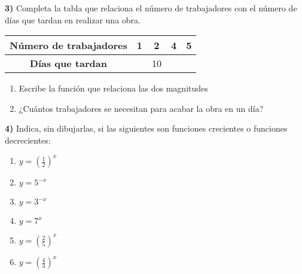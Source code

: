 \documentclass[12pt,a4paper]{article}
\begin{document}
\textbf{3)} Completa la tabla que relaciona el número de trabajadores con el número de días que tardan en realizar una obra.

\begin{center}
\begin{tabular}{|c|c|c|c|c|}
\hline
\textbf{Número de trabajadores} & 1 & 2 & 4 & 5 \\
\hline
\textbf{Días que tardan} & & 10 & & \\
\hline
\end{tabular}
\end{center}

\begin{enumerate}[label=\alph*.]
\item Escribe la función que relaciona las dos magnitudes
\item ¿Cuántos trabajadores se necesitan para acabar la obra en un día?
\end{enumerate}

\textbf{4)} Indica, sin dibujarlas, si las siguientes son funciones crecientes o funciones decrecientes:

\begin{enumerate}[label=\alph*.]
	
	\vspace{5mm}
	
\item $y = \left(\frac{1}{2}\right)^x$

\vspace{5mm}

\item $y = 5^{-x}$

\vspace{5mm}

\item $y = 3^{-x}$

\vspace{5mm}

\item $y = 7^x$

\vspace{5mm}

\item $y = \left(\frac{2}{5}\right)^x$

\vspace{5mm}

\item $y = \left(\frac{4}{3}\right)^x$

\vspace{5mm}

\end{enumerate}
\end{document}
